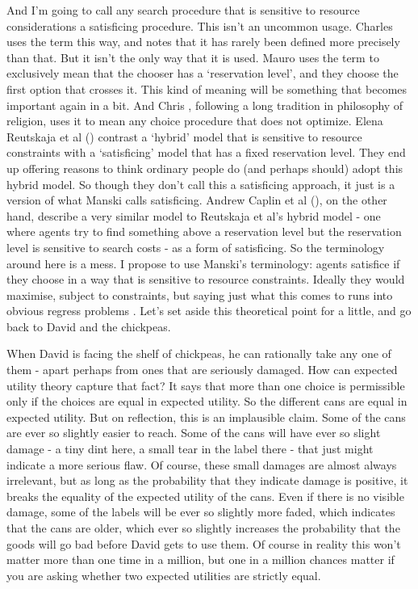 \documentclass[11pt,]{book}
\begin{document}
And I'm going to call any search procedure that is sensitive to resource considerations a satisficing procedure. This isn't an uncommon usage. Charles \citet{Manski2017} uses the term this way, and notes that it has rarely been defined more precisely than that. But it isn't the only way that it is used. Mauro \citet{Papi2013} uses the term to exclusively mean that the chooser has a `reservation level', and they choose the first option that crosses it. This kind of meaning will be something that becomes important again in a bit. And Chris \citet{Tucker2016}, following a long tradition in philosophy of religion, uses it to mean any choice procedure that does not optimize. Elena Reutskaja et al (\citeyearpar{Reutskaja2011}) contrast a `hybrid' model that is sensitive to resource constraints with a `satisficing' model that has a fixed reservation level. They end up offering reasons to think ordinary people do (and perhaps should) adopt this hybrid model. So though they don't call this a satisficing approach, it just is a version of what Manski calls satisficing. Andrew Caplin et al (\citeyearpar{Caplin2011}), on the other hand, describe a very similar model to Reutskaja et al's hybrid model - one where agents try to find something above a reservation level but the reservation level is sensitive to search costs - as a form of satisficing. So the terminology around here is a mess. I propose to use Manski's terminology: agents satisfice if they choose in a way that is sensitive to resource constraints. Ideally they would maximise, subject to constraints, but saying just what this comes to runs into obvious regress problems \citep{Conlisk1996}. Let's set aside this theoretical point for a little, and go back to David and the chickpeas.

When David is facing the shelf of chickpeas, he can rationally take any one of them - apart perhaps from ones that are seriously damaged. How can expected utility theory capture that fact? It says that more than one choice is permissible only if the choices are equal in expected utility. So the different cans are equal in expected utility. But on reflection, this is an implausible claim. Some of the cans are ever so slightly easier to reach. Some of the cans will have ever so slight damage - a tiny dint here, a small tear in the label there - that just might indicate a more serious flaw. Of course, these small damages are almost always irrelevant, but as long as the probability that they indicate damage is positive, it breaks the equality of the expected utility of the cans. Even if there is no visible damage, some of the labels will be ever so slightly more faded, which indicates that the cans are older, which ever so slightly increases the probability that the goods will go bad before David gets to use them. Of course in reality this won't matter more than one time in a million, but one in a million chances matter if you are asking whether two expected utilities are strictly equal.
\end{document}
